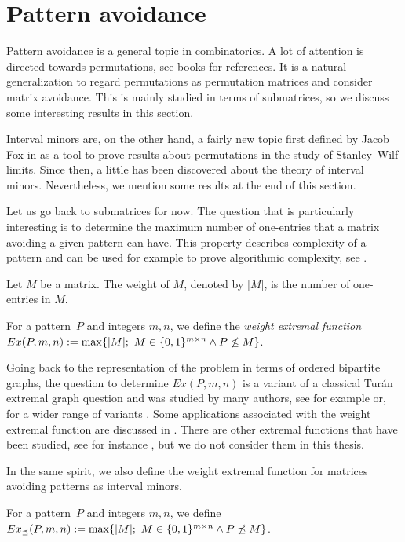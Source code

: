 \section{Pattern avoidance}
Pattern avoidance is a general topic in combinatorics. A lot of attention is directed towards permutations, see books \cite{bona, kitaev} for references. It is a natural generalization to regard permutations as permutation matrices and consider matrix avoidance. This is mainly studied in terms of submatrices, so we discuss some interesting results in this section.

Interval minors are, on the other hand, a fairly new topic first defined by Jacob Fox in \cite{fox} as a tool to prove results about permutations in the study of Stanley--Wilf limits. Since then, a little has been discovered about the theory of interval minors. Nevertheless, we mention some results at the end of this section.

Let us go back to submatrices for now. The question that is particularly interesting is to determine the maximum number of one-entries that a matrix avoiding a given pattern can have. This property describes complexity of a pattern and can be used for example to prove algorithmic complexity, see \cite{efrat}.

\begin{defn}
Let $M$ be a matrix. The weight of $M$, denoted by $|M|$, is the number of one-entries in $M$.
\end{defn}

\begin{defn}
For a pattern~$P$ and integers $m,n$, we define the \emph{weight extremal function}~$Ex(P,m,n):=\max\{|M|;\ M\in\Mat\wedge\PnsmM\}$.
\end{defn}

Going back to the representation of the problem in terms of ordered bipartite graphs, the question to determine $Ex(P,m,n)$ is a variant of a classical Tur{\'a}n extremal graph question and was studied by many authors, see for example \cite{tardos, furedi} or, for a wider range of variants \cite{brass, claesson, klazar, pach}. Some applications associated with the weight extremal function are discussed in \cite{fulek}. There are other extremal functions that have been studied, see for instance \cite{kyncl}, but we do not consider them in this thesis.

In the same spirit, we also define the weight extremal function for matrices avoiding patterns as interval minors.

\begin{defn}
For a pattern~$P$ and integers $m,n$, we define $Ex_{\preceq}(P,m,n):=\max\{|M|;\ M\in\Mat\wedge\PnimM\}$.
\end{defn}

